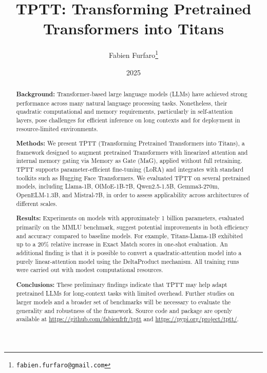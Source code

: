 \documentclass[10pt,a4paper]{article}
\title{\Large\textbf{TPTT: Transforming Pretrained Transformers into Titans}}
\author{\large Fabien Furfaro\thanks{\texttt{fabien.furfaro@gmail.com}}}
\date{\large 2025}
\begin{document}
\maketitle
    
\begin{abstract}
    \textbf{Background:} Transformer-based large language models (LLMs) have achieved strong performance across many natural language processing tasks. Nonetheless, their quadratic computational and memory requirements, particularly in self-attention layers, pose challenges for efficient inference on long contexts and for deployment in resource-limited environments.

    \textbf{Methods:} We present TPTT (Transforming Pretrained Transformers into Titans), a framework designed to augment pretrained Transformers with linearized attention and internal memory gating via Memory as Gate (MaG), applied without full retraining. TPTT supports parameter-efficient fine-tuning (LoRA) and integrates with standard toolkits such as Hugging Face Transformers. We evaluated TPTT on several pretrained models, including Llama-1B, OlMoE-1B-7B, Qwen2.5-1.5B, Gemma3-270m, OpenELM-1.3B, and Mistral-7B, in order to assess applicability across architectures of different scales.

    \textbf{Results:} Experiments on models with approximately 1 billion parameters, evaluated primarily on the MMLU benchmark, suggest potential improvements in both efficiency and accuracy compared to baseline models. For example, Titans-Llama-1B exhibited up to a 20\% relative increase in Exact Match scores in one-shot evaluation. An additional finding is that it is possible to convert a quadratic-attention model into a purely linear-attention model using the DeltaProduct mechanism. All training runs were carried out with modest computational resources.

    \textbf{Conclusions:} These preliminary findings indicate that TPTT may help adapt pretrained LLMs for long-context tasks with limited overhead. Further studies on larger models and a broader set of benchmarks will be necessary to evaluate the generality and robustness of the framework. Source code and package are openly available at \url{https://github.com/fabienfrfr/tptt} and \url{https://pypi.org/project/tptt/}.
\end{abstract}
\end{document}
